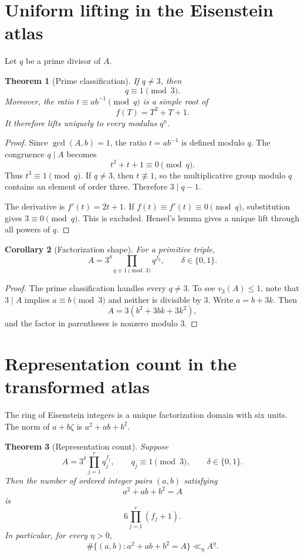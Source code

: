 \documentclass[11pt]{article}
\newtheorem{theorem}{Theorem}[section]
\newtheorem{corollary}[theorem]{Corollary}
\begin{document}
\section{Uniform lifting in the Eisenstein atlas}

Let $q$ be a prime divisor of $A$.

\begin{theorem}[Prime classification]
If $q\neq3$, then
\[
  \boxed{q\equiv1\pmod3.}
\]
Moreover, the ratio $t\equiv ab^{-1}\pmod q$ is a simple root of
\[
  f(T)=T^2+T+1.
\]
It therefore lifts uniquely to every modulus $q^n$.
\end{theorem}

\begin{proof}
Since $\gcd(A,b)=1$, the ratio $t=ab^{-1}$ is defined modulo $q$.  The congruence $q\mid A$ becomes
\[
  t^2+t+1\equiv0\pmod q.
\]
Thus $t^3\equiv1\pmod q$.  If $q\neq3$, then $t\not\equiv1$, so the multiplicative group modulo $q$ contains an element of order three.  Therefore $3\mid q-1$.

The derivative is $f'(t)=2t+1$.  If $f(t)\equiv f'(t)\equiv0\pmod q$, substitution gives $3\equiv0\pmod q$.  This is excluded.  Hensel's lemma gives a unique lift through all powers of $q$.
\end{proof}

\begin{corollary}[Factorization shape]
For a primitive triple,
\[
  \boxed{A=3^\delta\prod_{q\equiv1\pmod3}q^{f_q},
  \qquad \delta\in\{0,1\}.}
\]
\end{corollary}

\begin{proof}
The prime classification handles every $q\neq3$.  To see $v_3(A)\leq1$, note that $3\mid A$ implies $a\equiv b\pmod3$ and neither is divisible by $3$.  Write $a=b+3k$.  Then
\[
  A=3(b^2+3bk+3k^2),
\]
and the factor in parentheses is nonzero modulo $3$.
\end{proof}

\section{Representation count in the transformed atlas}

The ring of Eisenstein integers is a unique factorization domain with six units.  The norm of $a+b\zeta$ is $a^2+ab+b^2$.

\begin{theorem}[Representation count]
Suppose
\[
  A=3^\delta\prod_{j=1}^r q_j^{f_j},
  \qquad q_j\equiv1\pmod3,
  \qquad \delta\in\{0,1\}.
\]
Then the number of ordered integer pairs $(a,b)$ satisfying
\[
  a^2+ab+b^2=A
\]
is
\[
  \boxed{6\prod_{j=1}^r(f_j+1).}
\]
In particular, for every $\eta>0$,
\[
  \#\{(a,b):a^2+ab+b^2=A\}\ll_\eta A^\eta.
\]
\end{theorem}
\end{document}
